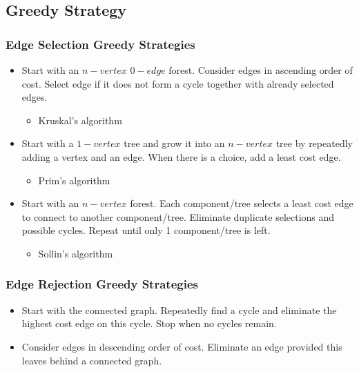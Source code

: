 \documentclass[newPxFont,sthlmFooter,nooffset]{beamer}
\begin{document}
\subsection{Greedy Strategy}
\begin{frame}[t]
  \frametitle{Edge Selection Greedy Strategies}
  \begin{itemize}
  \item Start with an $n-vertex$ $0-edge$ forest. Consider edges in ascending order of cost. Select edge if it does not form a cycle together with already selected edges.
    \begin{itemize}
    \item Kruskal's algorithm
    \end{itemize}

\item Start with a $1-vertex$ tree and grow it into an $n-vertex$ tree by repeatedly adding a vertex and an edge. When there is a choice, add a least cost edge.
  \begin{itemize}
  \item Prim's algorithm
  \end{itemize}
\item Start with an $n-vertex$ forest. Each component/tree selects a least cost edge to connect to another component/tree. Eliminate duplicate selections and possible cycles. Repeat until only 1 component/tree is left.
  \begin{itemize}
  \item Sollin's algorithm
  \end{itemize}

  \end{itemize}
\end{frame}


\begin{frame}[t]
  \frametitle{Edge Rejection Greedy Strategies}
  \begin{itemize}
  \item Start with the connected graph. Repeatedly find a cycle and eliminate the highest cost edge on this cycle. Stop when no cycles remain.
  \item Consider edges in descending order of cost. Eliminate an edge provided this leaves behind a connected graph.
  \end{itemize}
\end{frame}
\end{document}
